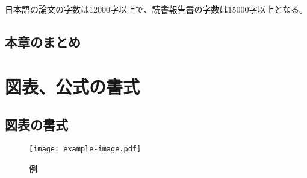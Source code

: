 日本語の論文の字数は12000字以上で、読書報告書の字数は15000字以上となる。

\section{本章のまとめ}



\chapter{図表、公式の書式}

\section{図表の書式}

\begin{figure}[ht]
  \centering
  \texttt{[image: example-image.pdf]}
  \caption{例}
  \label{fig:example}
\end{figure}

